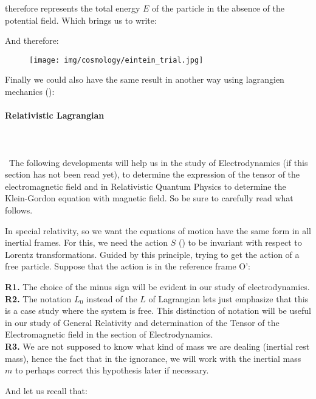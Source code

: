 	therefore represents the total energy $E$ of the particle in the absence of the potential field. Which brings us to write:
	
	And therefore:
	
	\begin{figure}[H]
		\begin{center}
		\texttt{[image: img/cosmology/eintein\_trial.jpg]}
		\end{center}
	\end{figure}
	Finally we could also have the same result in another way using lagrangien mechanics ():
	
	\paragraph{Relativistic Lagrangian}\mbox{}\\\\\
	The following developments will help us in the study of Electrodynamics (if this section has not been read yet), to determine the expression of the tensor of the electromagnetic field and in Relativistic Quantum Physics to determine the Klein-Gordon equation with magnetic field. So be sure to carefully read what follows.

	In special relativity, so we want the equations of motion have the same form in all inertial frames. For this, we need the action $S$ () to be invariant with respect to Lorentz transformations. Guided by this principle, trying to get the action of a free particle. Suppose that the action is in the reference frame O':
	
	\begin{tcolorbox}[title=Remarks,colframe=black,arc=10pt]
	\textbf{R1.} The choice of the minus sign will be evident in our study of electrodynamics.\\
	
	\textbf{R2.} The notation $L_0$ instead of the $L$ of Lagrangian lets just emphasize that this is a case study where the system is free. This distinction of notation will be useful in our study of General Relativity and determination of the Tensor of the Electromagnetic field in the section of Electrodynamics.\\
	
	\textbf{R3.} We are not supposed to know what kind of mass we are dealing (inertial rest mass), hence the fact that in the ignorance, we will work with the inertial mass $m$ to perhaps correct this hypothesis later if necessary.
	\end{tcolorbox}
	And let us recall that:
	
